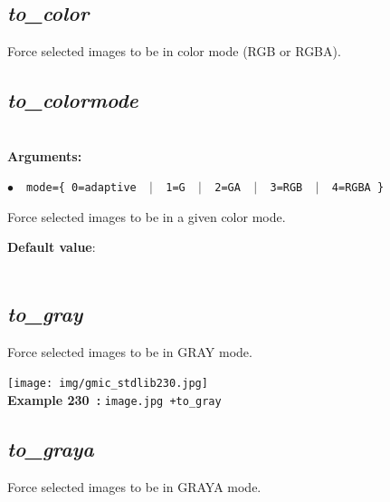 \documentclass[a4paper,10.5pt,twoside]{book}
\newcommand{\Cb}[1]{\textcolor{cb}{#1}}
\newcommand{\Cc}[1]{\textcolor{cc}{#1}}
\begin{document}
\subsection{\emph{to\_color} }\vspace*{-0.7em}
Force selected images to be in color mode (RGB or RGBA).


\subsection{\emph{to\_colormode} }\vspace*{-0.7em}
~\\\textbf{\Cb{Arguments: }}\begin{flushleft}
{\small \Cb{\hspace*{0.5cm}$\bullet$~~\texttt{mode=\{ 0=adaptive ~$|$~ 1=G ~$|$~ 2=GA ~$|$~ 3=RGB ~$|$~ 4=RGBA \}}}}\end{flushleft}
Force selected images to be in a given color mode.
\begin{flushleft}\Cc{\textbf{Default value}:\\~\\\hspace*{0.5cm}{\small $\bullet$~~\texttt{'mode=0'.}}}\end{flushleft}


\subsection{\emph{to\_gray} }\vspace*{-0.7em}
Force selected images to be in GRAY mode.
\begin{center}\texttt{[image: img/gmic\_stdlib230.jpg]}\\
{\footnotesize \textbf{Example 230~:} \texttt{image.jpg +to\_gray}}
\end{center}

\subsection{\emph{to\_graya} }\vspace*{-0.7em}
Force selected images to be in GRAYA mode.
\end{document}

